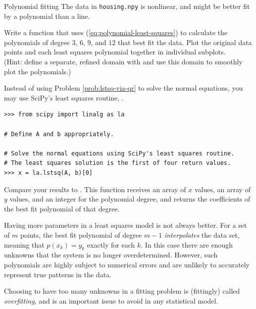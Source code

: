 \begin{problem}{Polynomial fitting}{}
The data in \texttt{housing.npy} is nonlinear, and might be better fit by a polynomial than a line.

Write a function that uses (\ref{eq:polynomial-least-squares}) to calculate the polynomials of degree $3$, $6$, $9$, and $12$ that best fit the data.
Plot the original data points and each least squares polynomial together in individual subplots.
\\(Hint: define a separate, refined domain with  and use this domain to smoothly plot the polynomials.)

Instead of using Problem \ref{prob:lstsq-via-qr} to solve the normal equations, you may use SciPy's least squares routine, .

\begin{lstlisting}
>>> from scipy import linalg as la

# Define A and b appropriately.

# Solve the normal equations using SciPy's least squares routine.
# The least squares solution is the first of four return values.
>>> x = la.lstsq(A, b)[0]
\end{lstlisting}

Compare your results to .
This function receives an array of $x$ values, an array of $y$ values, and an integer for the polynomial degree, and returns the coefficients of the best fit polynomial of that degree.

\label{prob:polynomial-least-squares}
\end{problem}

\begin{warn} %
Having more parameters in a least squares model is not always better.
For a set of $m$ points, the best fit polynomial of degree $m-1$ \emph{interpolates} the data set, meaning that $p(x_k) = y_k$ exactly for each $k$.
In this case there are enough unknowns that the system is no longer overdetermined.
However, such polynomials are highly subject to numerical errors and are unlikely to accurately represent true patterns in the data.

Choosing to have too many unknowns in a fitting problem is (fittingly) called \emph{overfitting}, and is an important issue to avoid in any statistical model.
\end{warn}

